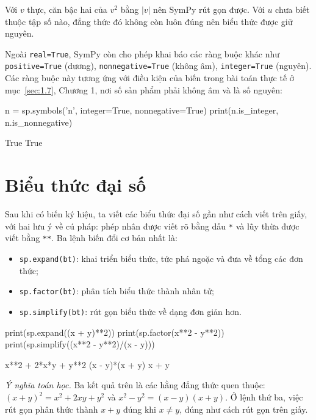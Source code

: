 \documentclass[12pt,a4paper]{report}
\begin{document}
Với $v$ thực, căn bậc hai của $v^2$ bằng $|v|$ nên SymPy rút gọn được. Với $u$ chưa biết thuộc tập số nào, đẳng thức đó không còn luôn đúng nên biểu thức được giữ nguyên.

Ngoài \texttt{real=True}, SymPy còn cho phép khai báo các ràng buộc khác như \texttt{positive=True} (dương), \texttt{nonnegative=True} (không âm), \texttt{integer=True} (nguyên). Các ràng buộc này tương ứng với điều kiện của biến trong bài toán thực tế ở mục~\ref*{sec:1.7}, Chương 1, nơi số sản phẩm phải không âm và là số nguyên:

\begin{madoanbox}
n = sp.symbols('n', integer=True, nonnegative=True)
print(n.is_integer, n.is_nonnegative)
\end{madoanbox}

\begin{ketquabox}
True True
\end{ketquabox}

\section{Biểu thức đại số}
\label{sec:2.4}

Sau khi có biến ký hiệu, ta viết các biểu thức đại số gần như cách viết trên giấy, với hai lưu ý về cú pháp: phép nhân được viết rõ bằng dấu \texttt{*} và lũy thừa được viết bằng \texttt{**}. Ba lệnh biến đổi cơ bản nhất là:

\begin{itemize}
\item \texttt{sp.expand(bt)}: khai triển biểu thức, tức phá ngoặc và đưa về tổng các đơn thức;
\item \texttt{sp.factor(bt)}: phân tích biểu thức thành nhân tử;
\item \texttt{sp.simplify(bt)}: rút gọn biểu thức về dạng đơn giản hơn.
\end{itemize}

\begin{madoanbox}
print(sp.expand((x + y)**2))
print(sp.factor(x**2 - y**2))
print(sp.simplify((x**2 - y**2)/(x - y)))
\end{madoanbox}

\begin{ketquabox}
x**2 + 2*x*y + y**2
(x - y)*(x + y)
x + y
\end{ketquabox}

\textit{Ý nghĩa toán học.} Ba kết quả trên là các hằng đẳng thức quen thuộc: $(x+y)^2=x^2+2xy+y^2$ và $x^2-y^2=(x-y)(x+y)$. Ở lệnh thứ ba, việc rút gọn phân thức thành $x+y$ đúng khi $x\ne y$, đúng như cách rút gọn trên giấy.
\end{document}
